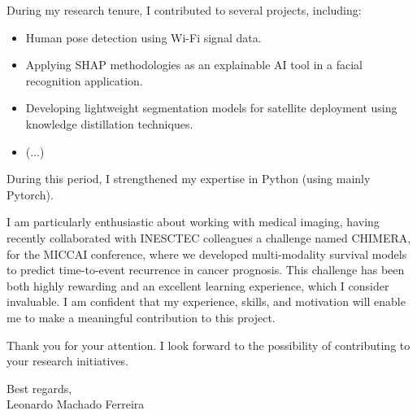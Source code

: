 \documentclass[11pt,a4paper]{article}
\begin{document}
	\vspace{1em}
	
	\noindent During my research tenure, I contributed to several projects, including:
	\begin{itemize}
		\item Human pose detection using Wi-Fi signal data.
		\item Applying SHAP methodologies as an explainable AI tool in a facial recognition application.
		\item Developing lightweight segmentation models for satellite deployment using knowledge distillation techniques.
		\item (...)
	\end{itemize}
	\vspace{-8pt}
	\noindent During this period, I strengthened my expertise in Python (using mainly Pytorch).
	
	\vspace{1em}
	
	\noindent I am particularly enthusiastic about working with medical imaging, having recently collaborated with INESCTEC colleagues a challenge named CHIMERA, for the MICCAI conference, where we developed multi-modality survival models to predict time-to-event recurrence in cancer prognosis. This challenge has been both highly rewarding and an excellent learning experience, which I consider invaluable. I am confident that my experience, skills, and motivation will enable me to make a meaningful contribution to this project.
	
	\vspace{1.5em}
	
	\noindent Thank you for your attention. I look forward to the possibility of contributing to your research initiatives.\vspace{2pt}
	
	\noindent Best regards,\\
	\noindent Leonardo Machado Ferreira
	
\end{document}
